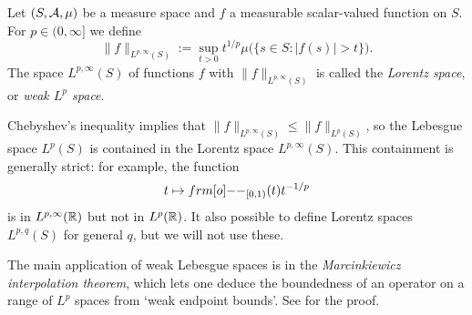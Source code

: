 \begin{defn}
  Let $(S,\mathcal{A},\mu)$ be a measure space and $f$ a measurable scalar-valued function on $S$.
  For $p \in (0,\infty]$ we define
  \begin{equation*}
    \|f\|_{L^{p,\infty}(S)} := \sup_{t > 0} t^{1/p} \mu\big( \{s \in S : |f(s)| > t\} \big).
  \end{equation*}
  The space $L^{p,\infty}(S)$ of functions $f$ with $\|f\|_{L^{p,\infty}(S)}$ is called the \emph{Lorentz space}, or \emph{weak $L^p$ space}.
\end{defn}

Chebyshev's inequality implies that $\|f\|_{L^{p,\infty}(S)} \leq \|f\|_{L^p(S)}$, so the Lebesgue space $L^p(S)$ is contained in the Lorentz space $L^{p,\infty}(S)$.
This containment is generally strict: for example, the function
\begin{equation*}
  t \mapsto \1_{[0,1)}(t) t^{-1/p}
\end{equation*}
is in $L^{p,\infty}(\mathbb{R})$ but not in $L^p(\mathbb{R})$.
It also possible to define Lorentz spaces $L^{p,q}(S)$ for general $q$, but we will not use these.

The main application of weak Lebesgue spaces is in the \emph{Marcinkiewicz interpolation theorem}, which lets one deduce the boundedness of an operator on a range of $L^p$ spaces from `weak endpoint bounds'.
See \cite[Theorem 1.3.2]{grafakos} for the proof.

